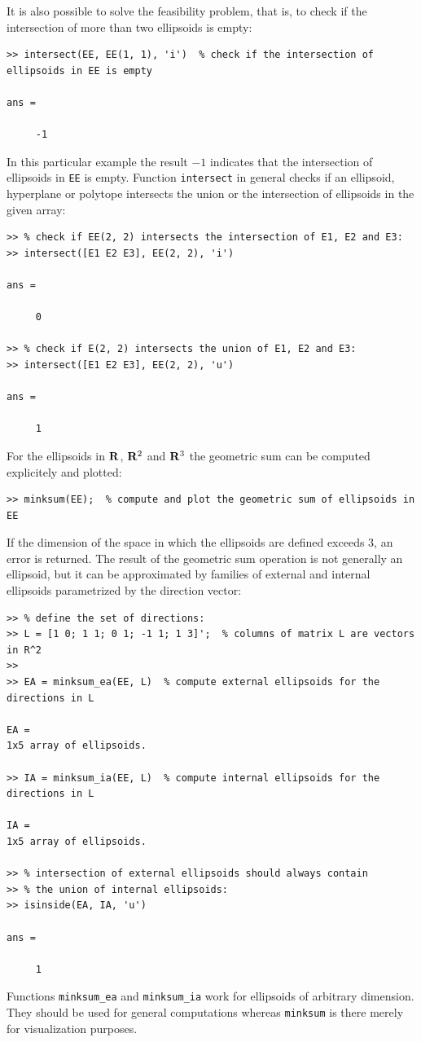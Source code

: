 \documentclass{report}
\begin{document}
It is also possible to solve the feasibility problem, that is, to check
if the intersection of more than two ellipsoids is empty:
{\tt \begin{verbatim}
>> intersect(EE, EE(1, 1), 'i')  % check if the intersection of ellipsoids in EE is empty

ans =

     -1
\end{verbatim} }
In this particular example the result $-1$ indicates that the intersection
of ellipsoids in {\tt EE} is empty.
Function {\tt intersect} in general checks if an ellipsoid,
hyperplane or polytope intersects the union or the intersection
of ellipsoids in the given array:
{\tt \begin{verbatim}
>> % check if EE(2, 2) intersects the intersection of E1, E2 and E3:
>> intersect([E1 E2 E3], EE(2, 2), 'i')

ans =

     0

>> % check if E(2, 2) intersects the union of E1, E2 and E3:
>> intersect([E1 E2 E3], EE(2, 2), 'u')

ans =

     1
\end{verbatim} }
For the ellipsoids in ${\bf R}$, ${\bf R}^2$ and ${\bf R}^3$ the geometric
sum can be computed explicitely and plotted:
{\tt \begin{verbatim}
>> minksum(EE);  % compute and plot the geometric sum of ellipsoids in EE
\end{verbatim} }
If the dimension of the space in which the ellipsoids are defined exceeds $3$,
an error is returned. The result of the geometric sum operation is
not generally an ellipsoid, but it can be approximated by families
of external and internal ellipsoids parametrized by the direction vector:
{\tt \begin{verbatim}
>> % define the set of directions:
>> L = [1 0; 1 1; 0 1; -1 1; 1 3]';  % columns of matrix L are vectors in R^2
>>
>> EA = minksum_ea(EE, L)  % compute external ellipsoids for the directions in L

EA =
1x5 array of ellipsoids.

>> IA = minksum_ia(EE, L)  % compute internal ellipsoids for the directions in L

IA =
1x5 array of ellipsoids.

>> % intersection of external ellipsoids should always contain
>> % the union of internal ellipsoids:
>> isinside(EA, IA, 'u')

ans =

     1
\end{verbatim} }
Functions {\tt minksum\_ea} and {\tt minksum\_ia} work for ellipsoids of
arbitrary dimension. They should be used for general computations
whereas {\tt minksum} is there merely for visualization purposes.
\end{document}
